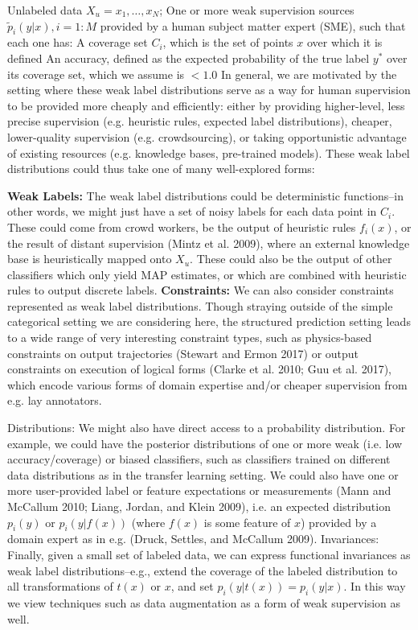 \documentclass[openany]{book}
\begin{document}
Unlabeled data \(X_u = x_1, …, x_N\);
One or more weak supervision sources \(\tilde{p}_i(y \vert x), i=1:M\) provided by a human subject matter expert (SME), such that each one has:
A coverage set \(C_i\), which is the set of points \(x\) over which it is defined
An accuracy, defined as the expected probability of the true label \(y^*\) over its coverage set, which we assume is \(\lt 1.0\)
In general, we are motivated by the setting where these weak label distributions serve as a way for human supervision to be provided more cheaply and efficiently: either by providing higher-level, less precise supervision (e.g. heuristic rules, expected label distributions), cheaper, lower-quality supervision (e.g. crowdsourcing), or taking opportunistic advantage of existing resources (e.g. knowledge bases, pre-trained models). These weak label distributions could thus take one of many well-explored forms:

\textbf{Weak Labels:} The weak label distributions could be deterministic functions–in other words, we might just have a set of noisy labels for each data point in \(C_i\). These could come from crowd workers, be the output of heuristic rules \(f_i(x)\), or the result of distant supervision (Mintz et al. 2009), where an external knowledge base is heuristically mapped onto \(X_u\). These could also be the output of other classifiers which only yield MAP estimates, or which are combined with heuristic rules to output discrete labels.
\textbf{Constraints:} We can also consider constraints represented as weak label distributions. Though straying outside of the simple categorical setting we are considering here, the structured prediction setting leads to a wide range of very interesting constraint types, such as physics-based constraints on output trajectories (Stewart and Ermon 2017) or output constraints on execution of logical forms (Clarke et al. 2010; Guu et al. 2017), which encode various forms of domain expertise and/or cheaper supervision from e.g. lay annotators.

Distributions: We might also have direct access to a probability distribution. For example, we could have the posterior distributions of one or more weak (i.e. low accuracy/coverage) or biased classifiers, such as classifiers trained on different data distributions as in the transfer learning setting. We could also have one or more user-provided label or feature expectations or measurements (Mann and McCallum 2010; Liang, Jordan, and Klein 2009), i.e. an expected distribution \(p_i(y)\) or \(p_i(y\vert f(x))\) (where \(f(x)\) is some feature of \(x\)) provided by a domain expert as in e.g. (Druck, Settles, and McCallum 2009).
Invariances: Finally, given a small set of labeled data, we can express functional invariances as weak label distributions–e.g., extend the coverage of the labeled distribution to all transformations of \(t(x)\) or \(x\), and set \(p_i(y\vert t(x)) = p_i(y\vert x)\). In this way we view techniques such as data augmentation as a form of weak supervision as well.
\end{document}
